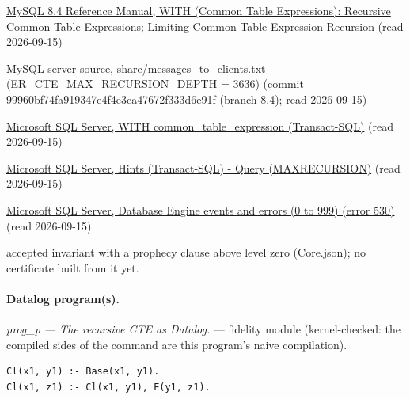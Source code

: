 \documentclass[10pt]{article}
\begin{document}
\begin{description}[leftmargin=2.6cm,style=nextline,itemsep=1pt]
\item[Sources] {\raggedright \href{https://dev.mysql.com/doc/refman/8.4/en/with.html}{MySQL 8.4 Reference Manual, WITH (Common Table Expressions): Recursive Common Table Expressions; Limiting Common Table Expression Recursion} (read 2026-09-15) \par \href{https://github.com/mysql/mysql-server/blob/8.4/share/messages_to_clients.txt}{MySQL server source, share/messages\_to\_clients.txt (ER\_CTE\_MAX\_RECURSION\_DEPTH = 3636)} (commit 99960bf74fa919347e4f4e3ca47672f333d6e91f (branch 8.4); read 2026-09-15) \par \href{https://learn.microsoft.com/en-us/sql/t-sql/queries/with-common-table-expression-transact-sql}{Microsoft SQL Server, WITH common\_table\_expression (Transact-SQL)} (read 2026-09-15) \par \href{https://learn.microsoft.com/en-us/sql/t-sql/queries/hints-transact-sql-query}{Microsoft SQL Server, Hints (Transact-SQL) - Query (MAXRECURSION)} (read 2026-09-15) \par \href{https://learn.microsoft.com/en-us/sql/relational-databases/errors-events/database-engine-events-and-errors-0-to-999}{Microsoft SQL Server, Database Engine events and errors (0 to 999) (error 530)} (read 2026-09-15)\par}

\item[Prophecy] accepted invariant with a prophecy clause above level zero (Core.json); no certificate built from it yet.

\end{description}

\paragraph{Datalog program(s).}

{\raggedright\textit{prog\_p --- The recursive CTE as Datalog.} --- fidelity module (kernel-checked: the compiled sides of the command are this program's naive compilation).\par}

\begin{Verbatim}[fontsize=\scriptsize,breaklines=true,breakanywhere=true,frame=single,framesep=1.5mm]
Cl(x1, y1) :- Base(x1, y1).
Cl(x1, z1) :- Cl(x1, y1), E(y1, z1).
\end{Verbatim}
\end{document}
